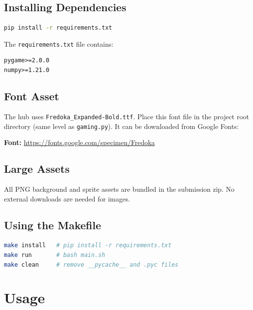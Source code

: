\documentclass[12pt,a4paper]{article}
\begin{document}
\subsection{Installing Dependencies}

\begin{lstlisting}[language=bash, caption={Install Python dependencies}]
pip install -r requirements.txt
\end{lstlisting}

\noindent The \texttt{requirements.txt} file contains:

\begin{lstlisting}[caption={requirements.txt}]
pygame>=2.0.0
numpy>=1.21.0
\end{lstlisting}

\subsection{Font Asset}
The hub uses \texttt{Fredoka\_Expanded-Bold.ttf}. Place this font file in the project root directory (same level as \texttt{gaming.py}). It can be downloaded from Google Fonts:

\begin{notebox}
\textbf{Font:} \url{https://fonts.google.com/specimen/Fredoka}
\end{notebox}

\subsection{Large Assets}
All PNG background and sprite assets are bundled in the submission zip. No external downloads are needed for images.

\subsection{Using the Makefile}

\begin{lstlisting}[language=bash, caption={Makefile targets}]
make install   # pip install -r requirements.txt
make run       # bash main.sh
make clean     # remove __pycache__ and .pyc files
\end{lstlisting}

\section{Usage}
\end{document}
